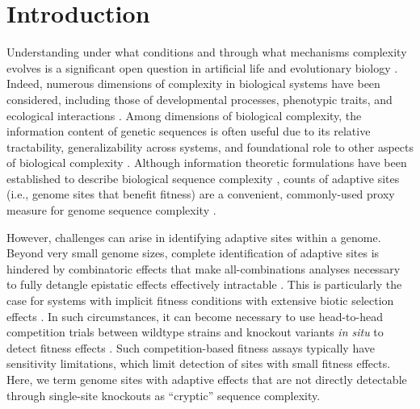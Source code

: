 \section{Introduction} \label{sec:introduction}

Understanding under what conditions and through what mechanisms complexity evolves is a significant open question in artificial life and evolutionary biology \citep{taylor2016open,pigliucci2009extended}.
Indeed, numerous dimensions of complexity in biological systems have been considered, including those of developmental processes, phenotypic traits, and ecological interactions \citep{szathmary2001can,mcshea2000functional}.
Among dimensions of biological complexity, the information content of genetic sequences is often useful due to its relative tractability, generalizability across systems, and foundational role to other aspects of biological complexity \citep{adami2002complexity}.
Although information theoretic formulations have been established to describe biological sequence complexity \citep{weiss2000information}, counts of adaptive sites (i.e., genome sites that benefit fitness) are a convenient, commonly-used proxy measure for genome sequence complexity \citep{dolson2019modes,moreno2021case}.

However, challenges can arise in identifying adaptive sites within a genome.
Beyond very small genome sizes, complete identification of adaptive sites is hindered by combinatoric effects that make all-combinations analyses necessary to fully detangle epistatic effects effectively intractable \citep{nitash2021information,adami2000evolution}.
This is particularly the case for systems with implicit fitness conditions with extensive biotic selection effects \citep{moreno2019toward,channon2000towards}.
In such circumstances, it can become necessary to use head-to-head competition trials between wildtype strains and knockout variants \textit{in situ} to detect fitness effects \citep{moreno2022exploring}.
Such competition-based fitness assays typically have sensitivity limitations, which limit detection of sites with small fitness effects.
Here, we term genome sites with adaptive effects that are not directly detectable through single-site knockouts as ``cryptic'' sequence complexity.



